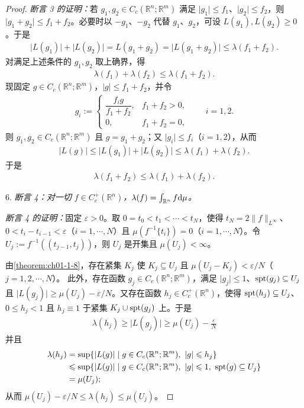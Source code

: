 \documentclass[../../main.tex]{subfiles}%
\begin{document}
\begin{proof}
\emph{断言 3 的证明：}若 $g_1,g_2\in C_c(\mathbb{R}^n;\mathbb{R}^m)$ 满足 $\lvert g_1\rvert\leqslant f_1$、$\lvert g_2\rvert\leqslant f_2$，则 $\lvert g_1+g_2\rvert\leqslant f_1+f_2$。必要时以 $-g_1$、$-g_2$ 代替 $g_1$、$g_2$，可设 $L(g_1),L(g_2)\geqslant0$。于是
\begin{align*}
\lvert L(g_1)\rvert+\lvert L(g_2)\rvert=L(g_1+g_2)=\lvert L(g_1+g_2)\rvert\leqslant\lambda(f_1+f_2).
\end{align*}
对满足上述条件的 $g_1,g_2$ 取上确界，得
\begin{align*}
\lambda(f_1)+\lambda(f_2)\leqslant\lambda(f_1+f_2).
\end{align*}
现固定 $g\in C_c(\mathbb{R}^n;\mathbb{R}^m)$，$\lvert g\rvert\leqslant f_1+f_2$，并令
\begin{align*}
g_i:=
\begin{cases}
\dfrac{f_ig}{f_1+f_2}, & f_1+f_2>0,\\[4pt]
0, & f_1+f_2=0,
\end{cases}
\qquad i=1,2.
\end{align*}
则 $g_1,g_2\in C_c(\mathbb{R}^n;\mathbb{R}^m)$ 且 $g=g_1+g_2$；又 $\lvert g_i\rvert\leqslant f_i$（$i=1,2$），从而
\begin{align*}
\lvert L(g)\rvert\leqslant\lvert L(g_1)\rvert+\lvert L(g_2)\rvert\leqslant\lambda(f_1)+\lambda(f_2).
\end{align*}
于是
\begin{align*}
\lambda(f_1+f_2)\leqslant\lambda(f_1)+\lambda(f_2).
\end{align*}

6. \emph{断言 4：对一切 $f\in C_c^+(\mathbb{R}^n)$，$\lambda(f)=\int_{\mathbb{R}^n}f\mathrm{d}\mu$。}

\emph{断言 4 的证明：}固定 $\varepsilon>0$。取 $0=t_0<t_1<\cdots<t_N$，使得 $t_N=2\lVert f\rVert_{L^{\infty}}$、$0<t_i-t_{i-1}<\varepsilon$（$i=1,\cdots,N$）且 $\mu(f^{-1}\{t_i\})=0$（$i=1,\cdots,N$）。令 $U_j:=f^{-1}((t_{j-1},t_j))$，则 $U_j$ 是开集且 $\mu(U_j)<\infty$。

由\cref{theorem:ch01-1-8}，存在紧集 $K_j$ 使 $K_j\subseteq U_j$ 且 $\mu(U_j-K_j)<\varepsilon/N$（$j=1,2,\cdots,N$）。%
此外，存在函数 $g_j\in C_c(\mathbb{R}^n;\mathbb{R}^m)$，满足 $\lvert g_j\rvert\leqslant1$、$\operatorname{spt}(g_j)\subseteq U_j$ 且 $\lvert L(g_j)\rvert\geqslant\mu(U_j)-\varepsilon/N$。又存在函数 $h_j\in C_c^+(\mathbb{R}^n)$，使得 $\operatorname{spt}(h_j)\subseteq U_j$、$0\leqslant h_j<1$ 且 $h_j\equiv1$ 于紧集 $K_j\cup\operatorname{spt}(g_j)$ 上。于是
\begin{align*}
\lambda(h_j)\geqslant\lvert L(g_j)\rvert\geqslant\mu(U_j)-\frac{\varepsilon}{N}
\end{align*}
并且
\begin{align*}
\lambda(h_j)&=\sup\{\lvert L(g)\rvert\mid g\in C_c(\mathbb{R}^n;\mathbb{R}^m),\ \lvert g\rvert\leqslant h_j\}\\
&\leqslant\sup\{\lvert L(g)\rvert\mid g\in C_c(\mathbb{R}^n;\mathbb{R}^m),\ \lvert g\rvert\leqslant1,\ \spt(g)\subseteq U_j\}\\
&=\mu(U_j);
\end{align*}
从而 $\mu(U_j)-\varepsilon/N\leqslant\lambda(h_j)\leqslant\mu(U_j)$。


\end{proof}
\end{document}
